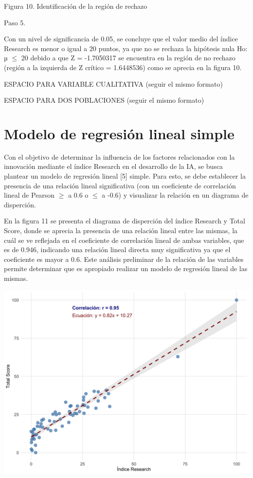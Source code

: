 \documentclass[
]{article}
\begin{document}
\begin{multicols}{2}
Figura 10. Identificación de la región de rechazo

Paso 5.

Con un nivel de significancia de 0.05, se concluye que el valor medio del índice Research es menor o igual a 20 puntos, ya que no se rechaza la hipótesis nula Ho: µ $≤$ 20 debido a que Z = -1.7050317 se encuentra en la región de no rechazo (región a la izquierda de Z crítico = 1.6448536) como se aprecia en la figura 10.

ESPACIO PARA VARIABLE CUALITATIVA (seguir el mismo formato)

ESPACIO PARA DOS POBLACIONES (seguir el mismo formato)


\section{Modelo de regresión lineal simple}

Con el objetivo de determinar la influencia de los factores relacionados con la innovación mediante el índice Research en el desarrollo de la IA, se busca plantear un modelo de regresión lineal [5] simple. Para esto, se debe establecer la presencia de una relación lineal significativa (con un coeficiente de correlación lineal de Pearson $≥$ a 0.6 o $≤$ a -0.6) y visualizar la relación en un diagrama de disperción.




En la figura 11 se presenta el diagrama de disperción del índice Research y Total Score, donde se aprecia la presencia de una relación lineal entre las mismas, la cuál se ve reflejada en el coeficiente de correlación lineal de ambas variables, que es de 0.946, indicando una relación lineal directa muy significativa ya que el coeficiente es mayor a 0.6. Este análisis preliminar de la relación de las variables permite determinar que es apropiado realizar un modelo de regresión lineal de las mismas.



\begin{center}
\includegraphics[width=\linewidth]{figura11.png}
\end{center}


\end{multicols}
\end{document}
